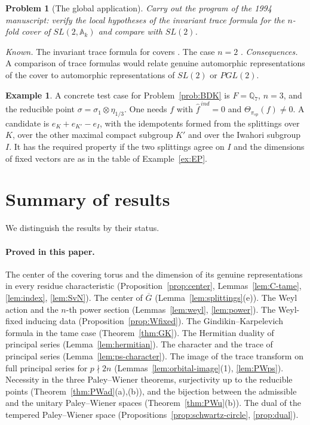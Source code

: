 \documentclass[12pt,letterpaper]{article}
\numberwithin{equation}{section}
\newtheorem{problem}[theorem]{Problem}
\theoremstyle{definition}
\newtheorem{example}[theorem]{Example}
\newcommand{\Q}{\mathbb Q}
\newcommand{\bG}{\overline{G}}
\begin{document}
\begin{problem}[The global application]\label{prob:global}
Carry out the program of the 1994 manuscript: verify the local hypotheses of the invariant
trace formula for the $n$-fold cover of $SL(2,\mathbb A_k)$ and compare with $SL(2)$.
\end{problem}
\emph{Known.}  The invariant trace formula for covers \cite{Li14}.  The case $n=2$
\cite{JoTr}.  \emph{Consequences.}  A comparison of trace formulas would relate genuine
automorphic representations of the cover to automorphic representations of $SL(2)$ or
$PGL(2)$.

\begin{example}\label{ex:open}
A concrete test case for Problem~\ref{prob:BDK} is $F=\Q_7$, $n=3$, and the reducible
point $\sigma=\sigma_1\otimes\eta_{1/3}$.  One needs $f$ with $\hat f^{\,ind}=0$ and
$\Theta_{\pi_{sp}}(f)\ne0$.  A candidate is $e_K+e_{K'}-e_I$, with the idempotents formed
from the splittings over $K$, over the other maximal compact subgroup $K'$ and over the
Iwahori subgroup $I$.  It has the required property if the two splittings agree on $I$ and
the dimensions of fixed vectors are as in the table of Example~\ref{ex:EP}.
\end{example}

\section{Summary of results}\label{sec:summary}

We distinguish the results by their status.

\paragraph{Proved in this paper.}  The center of the covering torus and the dimension of
its genuine representations in every residue characteristic
(Proposition~\ref{prop:center}, Lemmas~\ref{lem:C-tame}, \ref{lem:index}, \ref{lem:SvN}).
The center of $\bG$ (Lemma~\ref{lem:splittings}(e)).  The Weyl action and the $n$-th power
section (Lemmas~\ref{lem:weyl}, \ref{lem:power}).  The Weyl-fixed inducing data
(Proposition~\ref{prop:Wfixed}).  The Gindikin--Karpelevich formula in the tame case
(Theorem~\ref{thm:GK}).  The Hermitian duality of principal series
(Lemma~\ref{lem:hermitian}).  The character and the trace of principal series
(Lemma~\ref{lem:ps-character}).  The image of the trace transform on full principal series
for $p\nmid2n$ (Lemmas~\ref{lem:orbital-image}(1), \ref{lem:PWps}).  Necessity in the three
Paley--Wiener theorems, surjectivity up to the reducible points
(Theorem~\ref{thm:PWad}(a),(b)), and the bijection between the admissible and the unitary
Paley--Wiener spaces (Theorem~\ref{thm:PWu}(b)).  The dual of the tempered Paley--Wiener
space (Propositions~\ref{prop:schwartz-circle}, \ref{prop:dual}).
\end{document}

